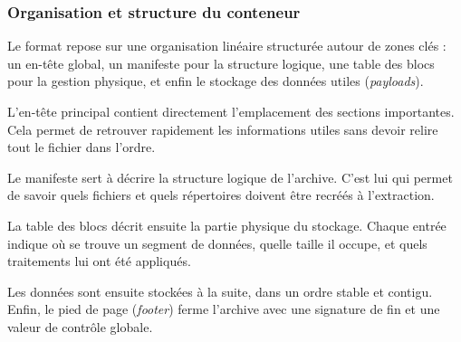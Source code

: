 \documentclass{article}
\begin{document}
\subsubsection*{Organisation et structure du conteneur}

Le format repose sur une organisation linéaire structurée autour de zones clés : un en-tête global, un manifeste pour la structure logique, une table des blocs pour la gestion physique, et enfin le stockage des données utiles (\textit{payloads}).

L'en-tête principal contient directement l'emplacement des sections importantes. Cela permet de retrouver rapidement les informations utiles sans devoir relire tout le fichier dans l'ordre.

Le manifeste sert à décrire la structure logique de l'archive. C'est lui qui permet de savoir quels fichiers et quels répertoires doivent être recréés à l'extraction.

La table des blocs décrit ensuite la partie physique du stockage. Chaque entrée indique où se trouve un segment de données, quelle taille il occupe, et quels traitements lui ont été appliqués.

Les données sont ensuite stockées à la suite, dans un ordre stable et contigu. Enfin, le pied de page (\textit{footer}) ferme l'archive avec une signature de fin et une valeur de contrôle globale.
\end{document}
